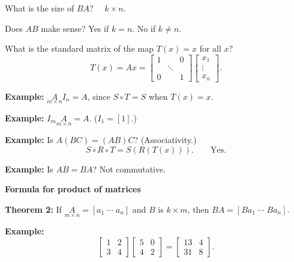 \documentclass{article}
\begin{document}
\medskip

What is the size of $BA$? $\quad k \times n$.

\medskip

Does $AB$ make sense? Yes if $k = n$. No if $k \neq n$.

\newpage

What is the standard matrix of the map $T(x) = x$ for all $x$?
\[
T(x) = Ax = \begin{bmatrix} 1 & & 0 \\ & \ddots & \\ 0 & & 1 \end{bmatrix} \begin{bmatrix} x_1 \\ \vdots \\ x_n \end{bmatrix}.
\]

\bigskip

\textbf{Example:} $\underset{m \times n}{A} I_n = A$, since $S \circ T = S$ when $T(x) = x$.

\bigskip

\textbf{Example:} $I_m \underset{m \times n}{A} = A$. \quad ($I_1 = [1]$.)

\bigskip

\textbf{Example:} Is $A(BC) = (AB)C$? (Associativity.)
\[
S \circ R \circ T = S(R(T(x))). \qquad \text{Yes.}
\]

\bigskip

\textbf{Example:} Is $AB = BA$? \quad Not commutative.

\newpage

\textbf{Formula for product of matrices}

\medskip

\textbf{Theorem 2:} If $\underset{m \times n}{A} = [a_1 \; \cdots \; a_n]$ and $B$ is $k \times m$, then $BA = [Ba_1 \; \cdots \; Ba_n]$.

\medskip

\textbf{Example:}
\[
\begin{bmatrix} 1 & 2 \\ 3 & 4 \end{bmatrix} \begin{bmatrix} 5 & 0 \\ 4 & 2 \end{bmatrix} = \begin{bmatrix} 13 & 4 \\ 31 & 8 \end{bmatrix}.
\]

\bigskip
\end{document}
